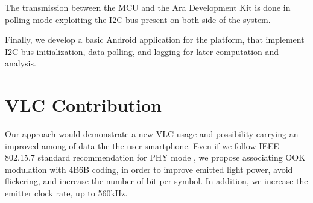 The transmission between the MCU and the Ara Development Kit is done in polling mode exploiting the I2C bus present on both side of the system. 

Finally, we develop a basic Android application for the platform, that implement I2C bus initialization, data polling, and logging for later computation and analysis.



\section{VLC Contribution}


Our approach would demonstrate a new VLC usage and possibility carrying an improved among of data the the user smartphone. Even if we follow IEEE 802.15.7 standard recommendation for PHY mode , we propose associating OOK modulation with 4B6B coding, in order to improve emitted light power, avoid flickering, and increase the number of bit per symbol. In addition, we increase the emitter clock rate, up to 560kHz.

